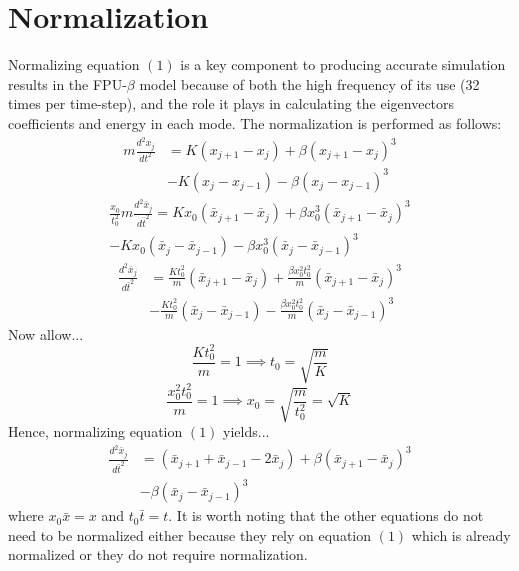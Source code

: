 \documentclass[twocolumn]{article}
\begin{document}
\section{Normalization}
\hspace{\parindent} Normalizing equation $(1)$ is a key component to producing accurate simulation results in the FPU-$\beta$ model because of both the high frequency of its use (32 times per time-step), and the role it plays in calculating the eigenvectors coefficients and energy in each mode. The normalization is performed as follows:
\begin{equation}
\begin{split}
	m\frac{d^2x_j}{dt^2}&=K(x_{j+1}-x_j)+\beta(x_{j+1}-x_j)^3\\
	&-K(x_j-x_{j-1})-\beta(x_j-x_{j-1})^3
\end{split}
\end{equation}
\begin{equation}
\begin{split}
	\frac{x_0}{t_0^{2}}m\frac{d^2\bar{x}_j}{d\bar{t}^2}=Kx_0(\bar{x}_{j+1}-\bar{x}_j)+\beta x_0^3(\bar{x}_{j+1}-\bar{x}_j)^3\\
	-Kx_0(\bar{x}_j-\bar{x}_{j-1})-\beta x_0^3(\bar{x}_j-\bar{x}_{j-1})^3
\end{split}
\end{equation}
\begin{equation}
\begin{split}
	\frac{d^2\bar{x}_j}{d\bar{t}^2}&=\frac{Kt_0^2}{m}(\bar{x}_{j+1}-\bar{x}_j)+\frac{\beta x_0^2 t_0^2}{m}(\bar{x}_{j+1}-\bar{x}_j)^3\\
	&-\frac{Kt_0^2}{m}(\bar{x}_j-\bar{x}_{j-1})-\frac{\beta x_0^2 t_0^2}{m}(\bar{x}_j-\bar{x}_{j-1})^3
\end{split}
\end{equation}
Now allow...
\begin{equation}
	\frac{Kt_0^2}{m}=1 \implies t_0=\sqrt{\frac{m}{K}}
\end{equation}
\begin{equation}
	\frac{x_0^2t_0^2}{m}=1 \implies x_0=\sqrt{\frac{m}{t_0^2}}=\sqrt{K}
\end{equation}
Hence, normalizing equation $(1)$ yields...
\begin{equation}
\begin{split}
	\frac{d^2\bar{x}_j}{d\bar{t}^2}&=(\bar{x}_{j+1}+\bar{x}_{j-1}-2\bar{x}_j)+\beta(\bar{x}_{j+1}-\bar{x}_j)^3\\
	&-\beta(\bar{x}_j-\bar{x}_{j-1})^3
\end{split}
\end{equation}
where $x_0\bar{x}=x$ and $t_0\bar{t}=t$. It is worth noting that the other equations do not need to be normalized either because they rely on equation $(1)$ which is already normalized or they do not require normalization.
\end{document}
